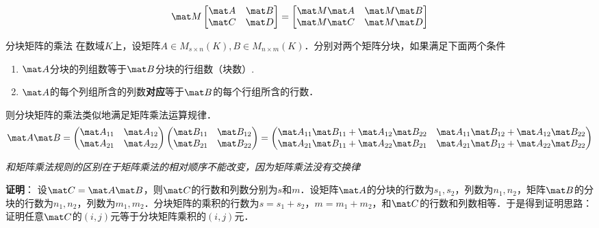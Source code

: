 \begin{equation}
\mat M
\begin{bmatrix}
\mat A & \mat B\\
\mat C & \mat D\\
\end{bmatrix}
=
\begin{bmatrix}
\mat M \mat A & \mat M \mat B\\
\mat M \mat C & \mat M \mat D\\
\end{bmatrix}
\end{equation}


\begin{theorem}{分块矩阵的乘法}
在数域$K$上，设矩阵$A\in{M_{s\times{n}}(K)},B\in{M_{n\times{m}}(K)}$．分别对两个矩阵分块，如果满足下面两个条件
\begin{enumerate}
\item $\mat A$分块的列组数等于$\mat B$分块的行组数（块数）.
\item $\mat A$的每个列组所含的列数\textbf{对应}等于$\mat B$的每个行组所含的行数．
\end{enumerate}
则分块矩阵的乘法类似地满足矩阵乘法运算规律．
\begin{equation}
\mat A\mat B=
\begin{pmatrix}
\mat A_{11} & \mat A_{12}\\
\mat A_{21} & \mat A_{22}
\end{pmatrix}
\begin{pmatrix}
\mat B_{11} & \mat B_{12}\\
\mat B_{21} & \mat B_{22}
\end{pmatrix}
=
\begin{pmatrix}
\mat A_{11}\mat B_{11}+\mat A_{12}\mat B_{22} & \mat A_{11}\mat B_{12}+\mat A_{12}\mat B_{22}\\
\mat A_{21}\mat B_{11}+\mat A_{22}\mat B_{21} & \mat A_{21}\mat B_{12}+\mat A_{22}\mat B_{22}
\end{pmatrix}
\end{equation}
\end{theorem}
\textsl{和矩阵乘法规则的区别在于矩阵乘法的相对顺序不能改变，因为矩阵乘法没有交换律}

\textbf{证明}：
设$\mat C=\mat A\mat B$，则$\mat C$的行数和列数分别为$s$和$m$．设矩阵$\mat A$的分块的行数为$s_1,s_2$，列数为$n_1,n_2$，矩阵$\mat B$的分块的行数为$n_1,n_2$，列数为$m_1,m_2$．分块矩阵的乘积的行数为$s=s_1+s_2$，$m=m_1+m_2$，和$\mat C$的行数和列数相等．于是得到证明思路：证明任意$\mat C$的$(i,j)$元等于分块矩阵乘积的$(i,j)$元．

